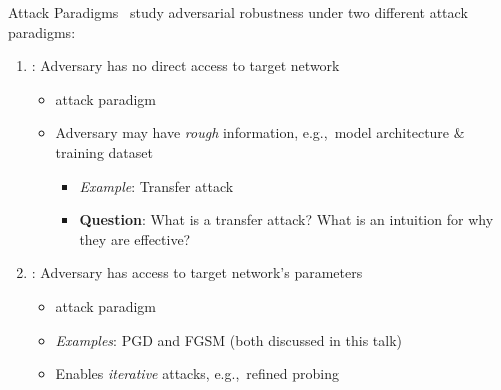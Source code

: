 \begin{frame}{Attack Paradigms}
  \madry\ study adversarial robustness under two different attack paradigms:
  \vfill
  \begin{enumerate}[<+->]
    \item {}: Adversary has no direct access to target network
      \begin{itemize}[<+->]
        \setlength\itemsep{6pt}
        \item {} attack paradigm
        \item Adversary may have \textit{rough} information, e.g.,~model architecture \& training dataset
          \begin{itemize}[<+->]
            \setlength{\itemsep}{6pt}
            \item \textit{Example}: Transfer attack
            \item \textbf{Question}: What is a transfer attack? What is an intuition for why they are effective?
          \end{itemize}
      \end{itemize}

    \vfill
    \item {}: Adversary has access to target network's parameters
      \begin{itemize}
        \setlength\itemsep{6pt}
        \item {} attack paradigm
        \item \textit{Examples}: PGD and FGSM (both discussed in this talk)
        \item Enables \textit{iterative} attacks, e.g.,~refined probing
      \end{itemize}
  \end{enumerate}
\end{frame}
